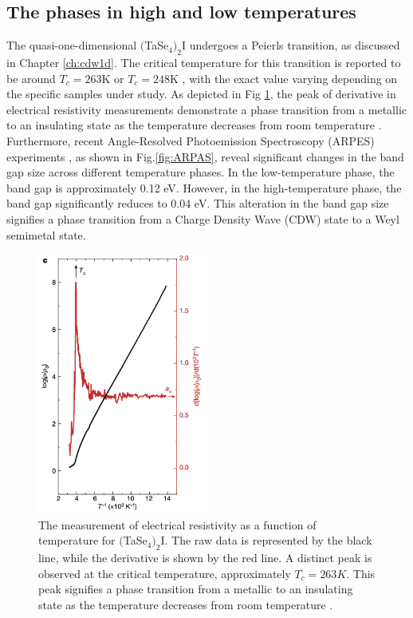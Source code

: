 \subsection{The phases in high and low temperatures}
The quasi-one-dimensional $($TaSe$_4)_2$I undergoes a Peierls transition, as discussed in Chapter \ref{ch:cdw1d}. The critical temperature for this transition is reported to be around $T_c=263$K \cite{gooth2019axionic} or $T_c=248$K \cite{shi2021charge}, with the exact value varying depending on the specific samples under study. As depicted in Fig \ref{fig:phasetransition}, the peak of derivative in electrical resistivity measurements demonstrate a phase transition from a metallic to an insulating state as the temperature decreases from room temperature \cite{gooth2019axionic}. Furthermore, recent Angle-Resolved Photoemission Spectroscopy (ARPES) experiments \cite{shi2021charge}, as shown in Fig.\ref{fig:ARPAS}, reveal significant changes in the band gap size across different temperature phases. In the low-temperature phase, the band gap is approximately 0.12 eV. However, in the high-temperature phase, the band gap significantly reduces to 0.04 eV. This alteration in the band gap size signifies a phase transition from a Charge Density Wave (CDW) state to a Weyl semimetal state.

\begin{figure}[h]
    \centering
    \includegraphics[width =0.5\textwidth]{images/phasetransition.png}
    \caption{The measurement of electrical resistivity as a function of temperature for $($TaSe$_4)_2$I. The raw data is represented by the black line, while the derivative is shown by the red line. A distinct peak is observed at the critical temperature, approximately $T_c=263K$. This peak signifies a phase transition from a metallic to an insulating state as the temperature decreases from room temperature \cite{gooth2019axionic}.}
    \label{fig:phasetransition}
\end{figure}

